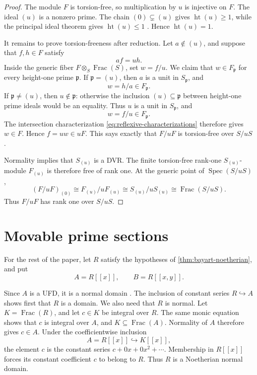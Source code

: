 \documentclass[reqno]{amsart}
\theoremstyle{plain}
\theoremstyle{definition}
\newcommand{\Spec}{\operatorname{Spec}}
\newcommand{\Frac}{\operatorname{Frac}}
\newcommand{\htp}{\operatorname{ht}}
\begin{document}
\begin{proof}
The module $F$ is torsion-free, so multiplication by $u$ is injective on
$F$.  The ideal $(u)$ is a nonzero prime.  The chain
$(0)\subsetneq(u)$ gives $\htp(u)\geq1$, while the principal ideal theorem
gives $\htp(u)\leq1$ \cite[Corollary~11.17]{AtiyahMacdonald}.  Hence
$\htp(u)=1$.

It remains to prove torsion-freeness after reduction.  Let
$a\notin(u)$, and suppose that $f,h\in F$ satisfy
\[
 af=uh.
\]
Inside the generic fiber $F\otimes_S\Frac(S)$, set $w=f/u$.  We claim
that $w\in F_{\mathfrak p}$ for every height-one prime $\mathfrak p$.
If $\mathfrak p=(u)$, then $a$ is a unit in $S_{\mathfrak p}$, and
\[
 w=h/a\in F_{\mathfrak p}.
\]
If $\mathfrak p\neq(u)$, then $u\notin\mathfrak p$: otherwise the inclusion
$(u)\subseteq\mathfrak p$ between height-one prime ideals would be an
equality.  Thus $u$ is a unit in $S_{\mathfrak p}$, and
\[
 w=f/u\in F_{\mathfrak p}.
\]
The intersection characterization \eqref{eq:reflexive-characterizations}
therefore gives $w\in F$.  Hence $f=uw\in uF$.  This says exactly that
$F/uF$ is torsion-free over $S/uS$.

Normality implies that $S_{(u)}$ is a DVR.  The finite
torsion-free rank-one $S_{(u)}$-module $F_{(u)}$ is therefore free of rank
one.  At the generic point of $\Spec(S/uS)$,
\[
 (F/uF)_{(0)}
 \cong F_{(u)}/uF_{(u)}
 \cong S_{(u)}/uS_{(u)}
 \cong\Frac(S/uS).
\]
Thus $F/uF$ has rank one over $S/uS$.
\end{proof}

\section{Movable prime sections}

For the rest of the paper, let $R$ satisfy the hypotheses of
\cref{thm:bayart-noetherian}, and put
\[
 A=R[[x]],\qquad B=R[[x,y]].
\]

Since $A$ is a UFD, it is a normal domain
\cite[p.~63]{AtiyahMacdonald}.  The inclusion of constant
series $R\hookrightarrow A$ shows first that $R$ is a domain.  We also
need that $R$ is normal.  Let $K=\Frac(R)$, and let $c\in K$ be integral
over $R$.  The same monic equation shows that $c$ is integral over $A$,
and $K\subseteq\Frac(A)$.  Normality of $A$ therefore gives $c\in A$.
Under the coefficientwise inclusion
\[
 A=R[[x]]\hookrightarrow K[[x]],
\]
the element $c$ is the constant series $c+0x+0x^2+\cdots$.  Membership
in $R[[x]]$ forces its constant coefficient $c$ to belong to $R$.  Thus
$R$ is a Noetherian normal domain.
\end{document}
